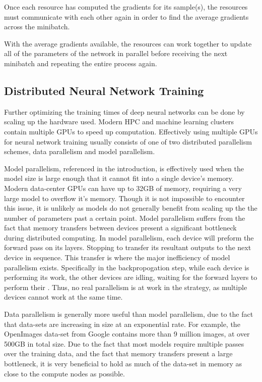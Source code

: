 \documentclass[11pt,a4paper]{article}
\begin{document}
Once each resource has computed the gradients for its sample(s), the resources must communicate with each other again in order to find the average gradients across the minibatch.

With the average gradients available, the resources can work together to update all of the parameters of the network in parallel before receiving the next minibatch and repeating the entire process again.

\subsection{Distributed Neural Network Training}

Further optimizing the training times of deep neural networks can be done by scaling up the hardware used. Modern HPC and machine learning clusters contain multiple GPUs to speed up computation. Effectively using multiple GPUs for neural network training usually consists of one of two distributed parallelism schemes, data parallelism and model parallelism. \cite{LS_DN}

Model parallelism, referenced in the introduction, is effectively used when the model size is large enough that it cannot fit into a single device's memory. Modern data-center GPUs can have up to 32GB of memory, requiring a very large model to overflow it's memory. Though it is not impossible to encounter this issue, it is unlikely as models do not generally benefit from scaling up the the number of parameters past a certain point. Model parallelism suffers from the fact that memory transfers between devices present a significant bottleneck during distributed computing. In model parallelism, each device will preform the forward pass on its layers. Stopping to transfer its resultant outputs to the next device in sequence. This transfer is where the major inefficiency of model parallelism exists. Specifically in the backpropogation step, while each device is performing its work, the other devices are idling, waiting for the forward layers to perform their  . Thus, no real parallelism is at work in the strategy, as multiple devices cannot work at the same time. 

Data parallelism is generally more useful than model parallelism, due to the fact that data-sets are increasing in size at an exponential rate. For example, the OpenImages data-set from Google \cite{openimages} contains more than 9 million images, at over 500GB in total size. Due to the fact that most models require multiple passes over the training data, and the fact that memory transfers present a large bottleneck, it is very beneficial to hold as much of the data-set in memory as close to the compute nodes as possible. 
\end{document}
